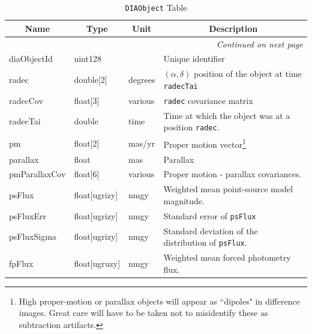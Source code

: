 \documentclass[12pt]{article}
\newcommand{\code}[1]{\texttt{#1}}
\newcommand{\DIAObject}{\code{DIAObject}\xspace}
\begin{document}
\begin{center}
\begin{longtable}{p{3cm}p{2cm}p{2cm}p{5cm}}
\caption[\DIAObject Table]{\DIAObject Table} \\

\hline \multicolumn{1}{c}{\bf Name} & \multicolumn{1}{c}{\bf Type} &
\multicolumn{1}{c}{\bf Unit} & \multicolumn{1}{c}{\bf Description} \\ \hline

\endhead

\hline \multicolumn{4}{r}{{\em Continued on next page}} \\
\endfoot

\hline\hline
\endlastfoot

diaObjectId & uint128 & ~ & Unique identifier \\ 

radec & double[2] & degrees & $(\alpha, \delta)$ position of the object at
time \texttt{radecTai} \\ 

radecCov & float[3] & various & \texttt{radec} covariance matrix \\ 

radecTai & double & time & Time at which the object was at a position
\texttt{radec}. \\ 

pm & float[2] & mas/yr & Proper motion vector\footnote{High proper-motion or
parallax objects will appear as ``dipoles" in difference images. Great care
will have to be taken not to misidentify these as subtraction artifacts.} \\ 

parallax & float & mas & Parallax \\ 

pmParallaxCov & float[6] & various & Proper motion - parallax covariances. \\ 

psFlux & float[ugrizy] & nmgy & Weighted mean point-source model magnitude. \\ 

psFluxErr & float[ugrizy] & nmgy & Standard error of {\tt psFlux}  \\ 

psFluxSigma & float[ugrizy] & nmgy & Standard deviation of the distribution of
{\tt psFlux}. \\ 

fpFlux & float[ugruzy] & nmgy & Weighted mean forced photometry flux.\\


\end{longtable}
\end{center}
\end{document}

